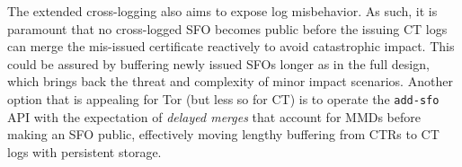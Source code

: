 The extended cross-logging also aims to expose log misbehavior.  As such, it is
paramount that no cross-logged SFO becomes public before the issuing CT logs
can merge the mis-issued certificate reactively to avoid catastrophic impact.
This could be assured by buffering newly issued SFOs longer as in the full
design, which brings back the threat and complexity of minor impact scenarios.
Another option that is appealing for Tor (but less so for CT) is to operate the
\texttt{add-sfo} API with the expectation of \emph{delayed merges} that account
for MMDs before making an SFO public, effectively moving lengthy buffering from
CTRs to CT logs with persistent storage.
